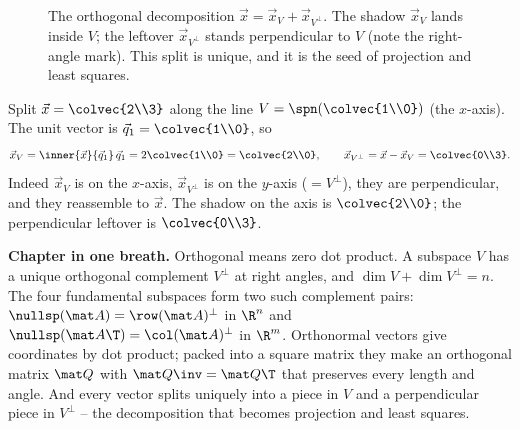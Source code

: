 \begin{figure}[H]
\centering
{}
\caption{The orthogonal decomposition $\vec x=\vec x_V+\vec x_{V^{\perp}}$. The shadow
$\vec x_V$ lands inside $V$; the leftover $\vec x_{V^{\perp}}$ stands perpendicular to $V$ (note the
right-angle mark). This split is unique, and it is the seed of projection and least squares.}
\label{ch17:decomp-pic}
\end{figure}

\begin{example}\label{ch17:split-example}
Split $\vec x=\colvec{2\\3}$ along the line $V=\spn\!\left(\colvec{1\\0}\right)$ (the $x$-axis). The
unit vector is $\vec q_1=\colvec{1\\0}$, so
\[
  \vec x_V = \inner{\vec x}{\vec q_1}\,\vec q_1 = 2\colvec{1\\0}=\colvec{2\\0},
  \qquad
  \vec x_{V^\perp} = \vec x-\vec x_V = \colvec{0\\3}.
\]
Indeed $\vec x_V$ is on the $x$-axis, $\vec x_{V^\perp}$ is on the $y$-axis ($=V^\perp$), they are
perpendicular, and they reassemble to $\vec x$. The shadow on the axis is $\colvec{2\\0}$; the
perpendicular leftover is $\colvec{0\\3}$.
\end{example}

\begin{focusbox}
\textbf{Chapter in one breath.} Orthogonal means zero dot product. A subspace $V$ has a unique
orthogonal complement $V^\perp$ at right angles, and $\dim V+\dim V^\perp=n$. The four fundamental
subspaces form two such complement pairs: $\nullsp(\mat A)=\row(\mat A)^\perp$ in $\R^n$ and
$\nullsp(\mat A\T)=\col(\mat A)^\perp$ in $\R^m$. Orthonormal vectors give coordinates by dot
product; packed into a square matrix they make an orthogonal matrix $\mat Q$ with $\mat Q\inv=\mat Q\T$
that preserves every length and angle. And every vector splits uniquely into a piece in $V$ and a
perpendicular piece in $V^\perp$ -- the decomposition that becomes projection and least squares.
\end{focusbox}

